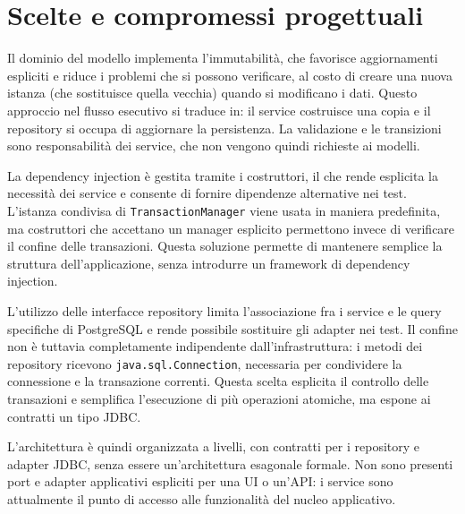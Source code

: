 \section{Scelte e compromessi progettuali}

Il dominio del modello implementa l'immutabilità, che favorisce aggiornamenti espliciti e riduce i problemi che si possono verificare, al costo di creare una nuova istanza (che sostituisce quella vecchia) quando si modificano i dati. Questo approccio nel flusso esecutivo si traduce in: il service costruisce una copia e il repository si occupa di aggiornare la persistenza. La validazione e le transizioni sono responsabilità dei service, che non vengono quindi richieste ai modelli.

La dependency injection è gestita tramite i costruttori, il che rende esplicita la necessità dei service e consente di fornire dipendenze alternative nei test. L'istanza condivisa di \texttt{TransactionManager} viene usata in maniera predefinita, ma costruttori che accettano un manager esplicito permettono invece di verificare il confine delle transazioni. Questa soluzione permette di mantenere semplice la struttura dell'applicazione, senza introdurre un framework di dependency injection.

L'utilizzo delle interfacce repository limita l'associazione fra i service e le query specifiche di PostgreSQL e rende possibile sostituire gli adapter nei test. Il confine non è tuttavia completamente indipendente dall'infrastruttura: i metodi dei repository ricevono \texttt{java.sql.Connection}, necessaria per condividere la connessione e la transazione correnti. Questa scelta esplicita il controllo delle transazioni e semplifica l'esecuzione di più operazioni atomiche, ma espone ai contratti un tipo JDBC.

L'architettura è quindi organizzata a livelli, con contratti per i repository e adapter JDBC, senza essere un'architettura esagonale formale. Non sono presenti port e adapter applicativi espliciti per una UI o un'API: i service sono attualmente il punto di accesso alle funzionalità del nucleo applicativo.